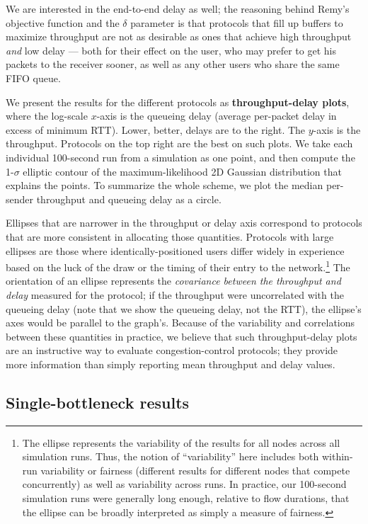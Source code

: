We are interested in the end-to-end delay as well; the reasoning
behind Remy's objective function and the $\delta$ parameter is that
protocols that fill up buffers to maximize throughput are not as
desirable as ones that achieve high throughput \emph{and} low delay
--- both for their effect on the user, who may prefer to get his
packets to the receiver sooner, as well as any other users who share
the same FIFO queue.

We present the results for the different protocols as {\bf
  throughput-delay plots}, where the log-scale $x$-axis is the
queueing delay (average per-packet delay in excess of minimum
RTT). Lower, better, delays are to the right.  The $y$-axis is the
throughput. Protocols on the top right are the best on such
plots. We take each individual 100-second run from a simulation as one
point, and then compute the 1-$\sigma$ elliptic contour
of the maximum-likelihood 2D Gaussian distribution that explains the
points. To summarize the whole scheme, we plot the median per-sender
throughput and queueing delay as a circle.

Ellipses that are narrower in the throughput or delay axis correspond
to protocols that are more consistent in allocating those
quantities. Protocols with large ellipses are those where
identically-positioned users differ widely in experience based on the
luck of the draw or the timing of their entry to the
network.\footnote{The ellipse represents the variability of the
  results for all nodes across all simulation runs. Thus, the notion
  of ``variability'' here includes both within-run variability or
  fairness (different results for different nodes that compete
  concurrently) as well as variability across runs. In practice, our
  100-second simulation runs were generally long enough, relative to flow
  durations, that the ellipse can be broadly interpreted as
  simply a measure of fairness.} The orientation of an ellipse
represents the {\em covariance between the throughput and delay}
measured for the protocol; if the throughput were uncorrelated with
the queueing delay (note that we show the queueing delay, not the
RTT), the ellipse's axes would be parallel to the graph's.  Because of
the variability and correlations between these quantities in practice,
we believe that such throughput-delay plots are an instructive way to
evaluate congestion-control protocols; they provide more information
than simply reporting mean throughput and delay values.

\subsection{Single-bottleneck results}


